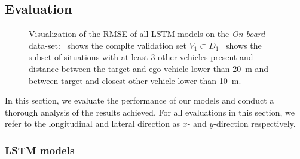 \subsection{Evaluation}
\label{subsec:eval_behav_pred}
\begin{figure}[t!]
	\centering
    \vspace{-0.3cm}
    \caption{Visualization of the \ac{RMSE} of all \ac{LSTM} models on the \emph{On-board} data-set:~\protect{} shows the complte validation set $V_1 \subset D_1$~\protect{} shows the subset of situations with at least \num{3} other vehicles present and distance between the target and ego vehicle lower than  \SI{20}{\meter} and between target and closest other vehicle lower than \SI{10}{\meter}.}\label{fig:rmse_on_board_all}
\end{figure}

In this section, we evaluate the performance of our models and conduct a thorough analysis of the results achieved.
For all evaluations in this section, we refer to the longitudinal and lateral direction as $x$- and $y$-direction respectively.

\subsubsection{\ac{LSTM} models}
\label{subsubsec:eval_lstm}

